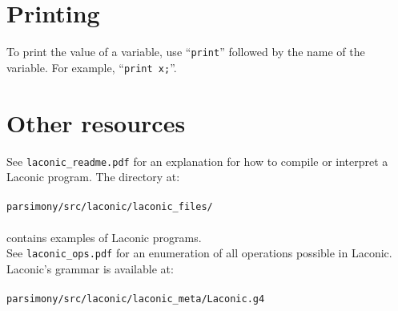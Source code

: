 \documentclass[11pt]{article}
\begin{document}
\section{Printing}

To print the value of a variable, use ``\texttt{print}'' followed by the name of the variable. For example, ``\texttt{print x;}''.

\section{Other resources}

See \texttt{laconic_readme.pdf} for an explanation for how to compile or interpret a Laconic program. The directory at: \\ \\
\texttt{parsimony/src/laconic/laconic_files/} \\ \\
contains examples of Laconic programs. \\

See \texttt{laconic_ops.pdf} for an enumeration of all operations possible in Laconic. Laconic's grammar is available at: \\ \\
\texttt{parsimony/src/laconic/laconic_meta/Laconic.g4}
\end{document}

